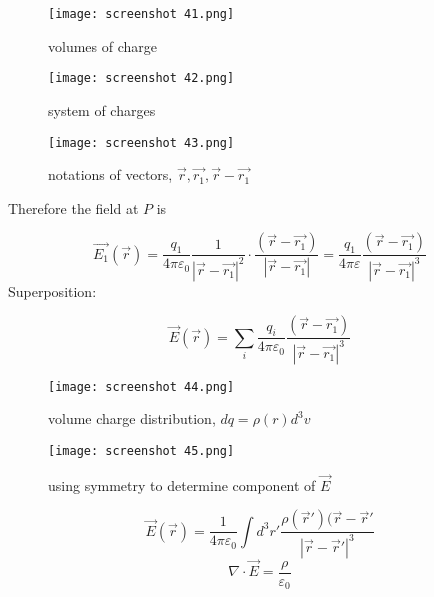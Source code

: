 \documentclass[svgnames]{article}   	%
\begin{document}
\begin{figure}[htb!]
  \centering
    \texttt{[image: screenshot 41.png]}
    \caption{volumes of charge}
\end{figure}





\begin{figure}[htb!]
  \centering
    \texttt{[image: screenshot 42.png]}
    \caption{system of charges}
\end{figure}

\begin{figure}[htb!]
  \centering
    \texttt{[image: screenshot 43.png]}
    \caption{notations of vectors, $\vec{r}, \vec{r_1}, \vec{r} - \vec{r_1}$}
\end{figure}


\begin{tcolorbox}[colback = blue!5!white, colframe = blue!50!black, title
  = System of point charges]

Therefore the field at $P$ is

\[
\vec{E_1}(\vec{r}) = \frac{q_1}{4\pi\varepsilon_0}\frac{1}{|\vec{r}
- \vec{r_1}|^2} \cdot \frac{(\vec{r} - \vec{r_1})}{|\vec{r}- \vec{r_1}|}
= \frac{q_1}{4\pi\varepsilon} \frac{(\vec{r}-\vec{r_1})}{|\vec{r}  - \vec{r_1}
|^3}
\]
Superposition: 

\[
\vec{E}(\vec{r} ) = \sum_i \frac{q_i}{4\pi\varepsilon_0} \frac{(\vec{r}
- \vec{r_1} )}{|\vec{r} - \vec{r_1} |^3}
\]
\end{tcolorbox}


\begin{figure}[htb!]
  \centering
    \texttt{[image: screenshot 44.png]}
    \caption{volume charge distribution, $dq = \rho(r) d^3 v$}
\end{figure}

\begin{figure}[htb!]
  \centering
    \texttt{[image: screenshot 45.png]}
    \caption{using symmetry to determine component of $\vec{E}$}
\end{figure}



\begin{tcolorbox}	
  
  \[
  \vec{E}(\vec{r}) = \frac{1}{4\pi\varepsilon_0} \int d^3r'
  \frac{\rho(\vec{r}')(\vec{r} - \vec{r}' }{|\vec{r} - \vec{r}'|^3}
  \]
  \[
    \nabla \cdot \vec{E} = \frac{\rho}{\varepsilon_0}
  \]

\end{tcolorbox}	
\end{document}
